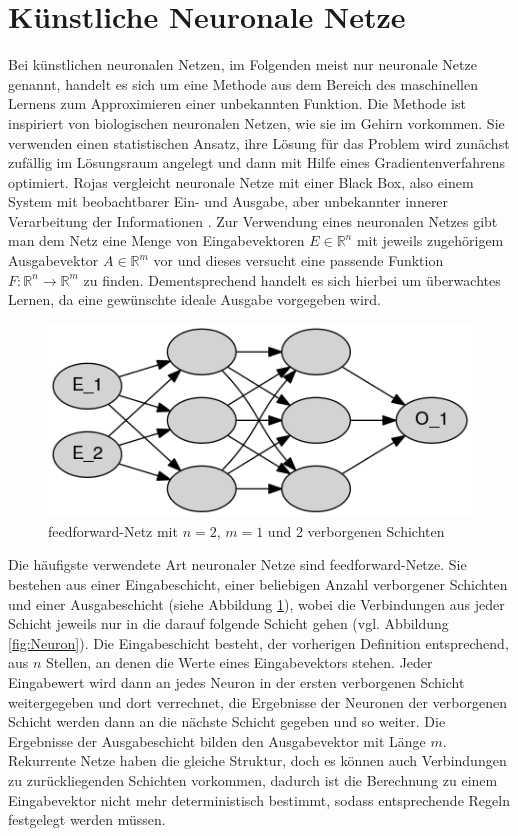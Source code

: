 \documentclass[
	12pt,
	a4paper,
	BCOR10mm,
	DIV14,
	listof=totoc,
	bibliography=totoc,
	headsepline
]{scrreprt}
\begin{document}
\section{Künstliche Neuronale Netze}
\label{back_nn}
Bei künstlichen neuronalen Netzen, im Folgenden meist nur neuronale Netze genannt, handelt es sich um eine Methode aus dem Bereich des maschinellen Lernens zum Approximieren einer unbekannten Funktion. Die Methode ist inspiriert von biologischen neuronalen Netzen, wie sie im Gehirn vorkommen. 
Sie verwenden einen statistischen Ansatz, ihre Lösung für das Problem wird zunächst zufällig im Lösungsraum angelegt und dann mit Hilfe eines Gradientenverfahrens optimiert.
Rojas vergleicht neuronale Netze mit einer Black Box, also einem System mit beobachtbarer Ein- und Ausgabe, aber unbekannter innerer Verarbeitung der Informationen \cite{Rojas:1996:NNS:235222}. 
Zur Verwendung eines neuronalen Netzes gibt man dem Netz eine Menge von Eingabevektoren $E \in \mathbb{R}^n$ mit jeweils zugehörigem Ausgabevektor $A \in \mathbb{R}^m$ vor und dieses versucht eine passende Funktion $F: \mathbb{R}^n \rightarrow \mathbb{R}^m$ zu finden. Dementsprechend handelt es sich hierbei um überwachtes Lernen, da eine gewünschte ideale Ausgabe vorgegeben wird.

\begin{figure}[h]
	\begin{center}
		\includegraphics[height=.20\textwidth]{Dot/netz.png}
	\end{center}
	\caption{feedforward-Netz mit $n=2$, $m=1$ und 2 verborgenen Schichten}
	\label{fig:Schichten}
\end{figure}

Die häufigste verwendete Art neuronaler Netze sind feedforward-Netze. Sie bestehen aus einer Eingabeschicht, einer beliebigen Anzahl verborgener Schichten und einer Ausgabeschicht (siehe Abbildung \ref{fig:Schichten}), wobei die Verbindungen aus jeder Schicht jeweils nur in die darauf folgende Schicht gehen (vgl. Abbildung \ref{fig:Neuron}).
Die Eingabeschicht besteht, der vorherigen Definition entsprechend, aus $n$ Stellen, an denen die Werte eines Eingabevektors stehen. Jeder Eingabewert wird dann an jedes Neuron in der ersten verborgenen Schicht weitergegeben und dort verrechnet, die Ergebnisse der Neuronen der verborgenen Schicht werden dann an die nächste Schicht gegeben und so weiter.
Die Ergebnisse der Ausgabeschicht bilden den Ausgabevektor mit Länge $m$.\\
Rekurrente Netze haben die gleiche Struktur, doch es können auch Verbindungen zu zurückliegenden Schichten vorkommen, dadurch ist die Berechnung zu einem Eingabevektor nicht mehr deterministisch bestimmt, sodass entsprechende Regeln festgelegt werden müssen.
\end{document}
